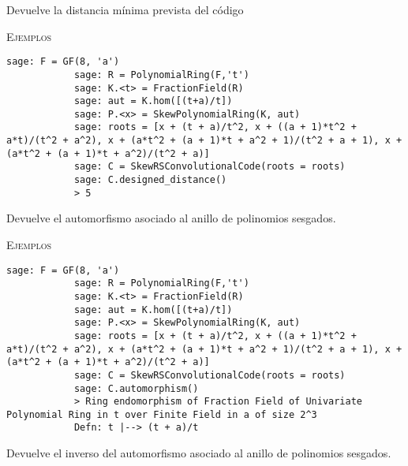 \begin{description}[leftmargin=1em, font=\normalfont\ttfamily, style=nextline]
    \begin{description}[font=\ttfamily,style=nextline]
        \item[designed\_distance(self)] 
        Devuelve la distancia mínima prevista del código
    
        \textsc{Ejemplos}

        \begin{lstlisting}[gobble=12]
            sage: F = GF(8, 'a')
            sage: R = PolynomialRing(F,'t')
            sage: K.<t> = FractionField(R)
            sage: aut = K.hom([(t+a)/t])
            sage: P.<x> = SkewPolynomialRing(K, aut)
            sage: roots = [x + (t + a)/t^2, x + ((a + 1)*t^2 + a*t)/(t^2 + a^2), x + (a*t^2 + (a + 1)*t + a^2 + 1)/(t^2 + a + 1), x + (a*t^2 + (a + 1)*t + a^2)/(t^2 + a)]
            sage: C = SkewRSConvolutionalCode(roots = roots) 
            sage: C.designed_distance()
            > 5
        \end{lstlisting} 
    \end{description}

    \begin{description}[font=\ttfamily,style=nextline]
        \item[automorphism(self)] 
        Devuelve el automorfismo asociado al anillo de polinomios sesgados.
    
        \textsc{Ejemplos}

        \begin{lstlisting}[gobble=12]
            sage: F = GF(8, 'a')
            sage: R = PolynomialRing(F,'t')
            sage: K.<t> = FractionField(R)
            sage: aut = K.hom([(t+a)/t])
            sage: P.<x> = SkewPolynomialRing(K, aut)
            sage: roots = [x + (t + a)/t^2, x + ((a + 1)*t^2 + a*t)/(t^2 + a^2), x + (a*t^2 + (a + 1)*t + a^2 + 1)/(t^2 + a + 1), x + (a*t^2 + (a + 1)*t + a^2)/(t^2 + a)]
            sage: C = SkewRSConvolutionalCode(roots = roots) 
            sage: C.automorphism()
            > Ring endomorphism of Fraction Field of Univariate Polynomial Ring in t over Finite Field in a of size 2^3
            Defn: t |--> (t + a)/t
        \end{lstlisting} 
    \end{description}

    \begin{description}[font=\ttfamily,style=nextline]
        \item[inverse\_automorphism(self)] 
        Devuelve el inverso del automorfismo asociado al anillo de polinomios sesgados.


\end{description}
\end{description}
